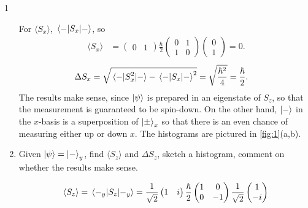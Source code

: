 \documentclass[11pt]{article}
\begin{document}
\begin{problem}{1}
\begin{enumerate}[label=(\alph*)]
\begin{answer}
        For \( \langle S_x \rangle \), \( \ev{S_x}{-} \), so
        \begin{equation}
        \label{eq:3}
        \begin{aligned}
          \langle S_x \rangle &= \begin{pmatrix}
0  & 1
 \end{pmatrix} \frac{\hbar}{2} \begin{pmatrix}
0  & 1 \\
1  & 0
 \end{pmatrix} \begin{pmatrix}
0 \\
1
 \end{pmatrix} = 0.
        \end{aligned}
      \end{equation}
      \begin{equation}
      \label{eq:4}
      \begin{aligned}
        \Delta S_x &= \sqrt{\ev{S_{x}^2}{-} - \ev{S_x}{-}^2} = \sqrt{\frac{\hbar^2}{4}} = \frac{\hbar}{2}.
      \end{aligned}
    \end{equation}
    The results make sense, since \( \ket{\psi} \) is prepared in an eigenstate of \( S_z \), so that the measurement is guaranteed to be spin-down.
    On the other hand, \( \ket{-} \) in the \( x \)-basis is a superposition of \( \ket{\pm}_{x} \) so that there is an even chance of measuring either up or down \( x \).
    The histograms are pictured in \cref{fig:1}(a,b).
        \end{answer}
  \item Given \( \ket{\psi} = \ket{-}_y \), find \( \langle S_z \rangle \) and \( \Delta S_z \), sketch a histogram, comment on whether the results make sense.
        \begin{answer}
          \begin{equation}
          \label{eq:5}
          \begin{aligned}
            \langle S_z \rangle &= \ev{S_z}{-_y} = \frac{1}{\sqrt{2}} \begin{pmatrix}
1  & i
 \end{pmatrix}
 \frac{\hbar}{2} \begin{pmatrix}
1  & 0 \\
0  & -1
 \end{pmatrix} \frac{1}{\sqrt{2}} \begin{pmatrix}
1 \\
-i
 \end{pmatrix} \\

\end{aligned}
\end{equation}
\end{answer}
\end{enumerate}
\end{problem}
\end{document}
